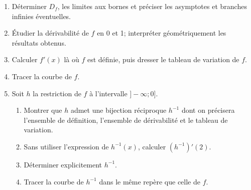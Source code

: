 \documentclass[12pt]{article}
\begin{document}
\begin{enumerate}
    \item Déterminer $D_f$, les limites aux bornes et préciser les asymptotes et branches infinies éventuelles.
    \item Étudier la dérivabilité de $f$ en 0 et 1; interpréter géométriquement les résultats obtenus.
    \item Calculer $f'(x)$ là où $f$ est définie, puis dresser le tableau de variation de $f$.
    \item Tracer la courbe de $f$.
    \item Soit $h$ la restriction de $f$ à l’intervalle $]-\infty ; 0]$.
    \begin{enumerate}
        \item Montrer que $h$ admet une bijection réciproque $h^{-1}$ dont on précisera l’ensemble de définition, l’ensemble de dérivabilité et le tableau de variation.
        \item Sans utiliser l’expression de $h^{-1}(x)$, calculer $(h^{-1})'(2)$.
        \item Déterminer explicitement $h^{-1}$.
        \item Tracer la courbe de $h^{-1}$ dans le même repère que celle de $f$.
    \end{enumerate}
\end{enumerate}
\end{document}
